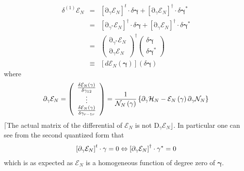 \documentclass[aps,preprint]{revtex4}
\begin{document}
\begin{eqnarray}
\delta ^{\left( 1\right) }\mathcal{E}_{N} &=&\left[ \mathrm{\partial }%
_{\gamma }\mathcal{E}_{N}\right] ^{t}\cdot \delta \mathbf{\gamma }+\left[ 
\mathrm{\partial }_{\gamma }\mathcal{E}_{N}\right] ^{\dagger }\cdot \delta 
\mathbf{\gamma }^{\ast }  \nonumber \\
&=&\left[ \mathrm{\partial }_{\gamma ^{\ast }}\mathcal{E}_{N}\right]
^{\dagger }\cdot \delta \mathbf{\gamma }+\left[ \mathrm{\partial }_{\gamma }%
\mathcal{E}_{N}\right] ^{\dagger }\cdot \delta \mathbf{\gamma }^{\ast } 
\nonumber \\
&=&\left( 
\begin{array}{c}
\mathrm{\partial }_{\gamma ^{\ast }}\mathcal{E}_{N} \\ 
\mathrm{\partial }_{\gamma }\mathcal{E}_{N}%
\end{array}%
\right) ^{\dagger }\left( 
\begin{array}{c}
\delta \mathbf{\gamma } \\ 
\delta \mathbf{\gamma }^{\ast }%
\end{array}%
\right)   \nonumber \\
&\equiv &\left[ d\mathcal{E}_{N}\left( \mathbf{\gamma }\right) \right]
\left( \delta \mathbf{\gamma }\right) 
\end{eqnarray}%
where 
\begin{equation}
\mathrm{\partial }_{\gamma }\mathcal{E}_{N}=\left( 
\begin{array}{c}
\frac{\delta \mathcal{E}_{N}\left( \mathbf{\gamma }\right) }{\delta \gamma
_{12}} \\ 
\vdots  \\ 
\frac{\delta \mathcal{E}_{N}\left( \mathbf{\gamma }\right) }{\delta \gamma
_{r-1r}}%
\end{array}%
\right) =\frac{1}{\mathcal{N}_{N}\left( \mathbf{\gamma }\right) }\left\{ 
\mathrm{\partial }_{\gamma }\mathcal{H}_{N}-\mathcal{E}_{N}\left( \mathbf{%
\gamma }\right) \mathrm{\partial }_{\gamma }\mathcal{N}_{N}\right\} 
\end{equation}%
$\lceil $The actual matrix of the differential of $\mathcal{E}_{N}$ is not $%
\mathrm{D}_{\gamma }\mathcal{E}_{N}\rfloor .$ In particular one can see from
the second quantized form that 
\begin{equation}
\left[ \mathrm{\partial }_{\gamma }\mathcal{E}_{N}\right] ^{t}\cdot \mathbf{%
\gamma }=0\Leftrightarrow \left[ \mathrm{\partial }_{\gamma }\mathcal{E}_{N}%
\right] ^{\dagger }\cdot \mathbf{\gamma }^{\ast }=0
\end{equation}%
which is as expected as $\mathcal{E}_{N}$ is a homogeneous function of
degree zero of $\mathbf{\gamma }$.
\end{document}
